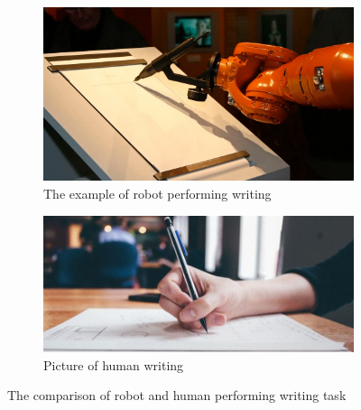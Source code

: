 \documentclass[report.tex]{subfiles}
\begin{document}
     \begin{figure}[H]
        \captionsetup[figure]{justification=centering}
        \begin{subfigure}{0.49\textwidth}
                \centering
                \includegraphics[width=\linewidth]{images/robot_write.png}
                \caption{The example of robot performing writing \cite{Newton_2017}}
                \label{robot_write}
            \end{subfigure}
            \begin{subfigure}{0.49\textwidth}
                \centering
                \includegraphics[width=\linewidth]{images/human_write.jpg}
                \caption{Picture of human writing \cite{Says_2022}}
                \label{human_write}
            \end{subfigure}
            \caption{The comparison of robot and human performing writing task}
    \end{figure}
\end{document}
